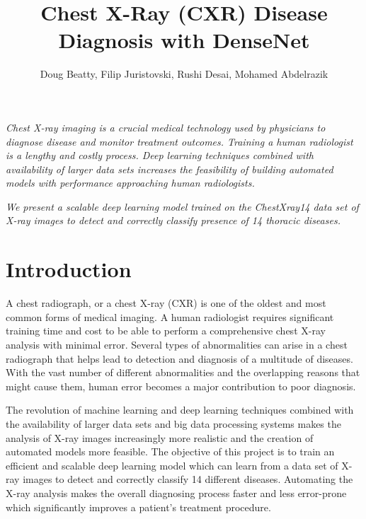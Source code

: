 \documentclass{amia}
\begin{document}
\title{Chest X-Ray (CXR) Disease Diagnosis with DenseNet}

\author{Doug Beatty, Filip Juristovski, Rushi Desai, Mohamed Abdelrazik}


\maketitle


\textit{Chest X-ray imaging \cite{ref1} is a crucial medical technology used by physicians to diagnose disease and monitor treatment outcomes. Training a human radiologist is a lengthy and costly process. Deep learning techniques combined with availability of larger data sets increases the feasibility of building automated models with performance approaching human radiologists.}

\textit{We present a scalable deep learning model trained on the ChestXray14 \cite{ref7} data set of X-ray images to detect and correctly classify presence of 14 thoracic diseases.}

\section*{Introduction}
A chest radiograph\cite{ref1}, or a chest X-ray (CXR) is one of the oldest and most common forms of medical imaging. A human radiologist requires significant training time and cost to be able to perform a comprehensive chest X-ray analysis with minimal error. Several types of abnormalities can arise in a chest radiograph that helps lead to detection and diagnosis of a multitude of diseases. With the vast number of different abnormalities and the overlapping reasons that might cause them, human error becomes a major contribution to poor diagnosis.

The revolution of machine learning and deep learning techniques combined with the availability of larger data sets\cite{ref2} and big data processing systems\cite{ref3} makes the analysis of X-ray images increasingly more realistic and the creation of automated models more feasible. The objective of this project is to train an efficient and scalable deep learning model which can learn from a data set of X-ray images to detect and correctly classify 14 different diseases. Automating the X-ray analysis makes the overall diagnosing process faster and less error-prone which significantly improves a patient’s treatment procedure.
\end{document}
